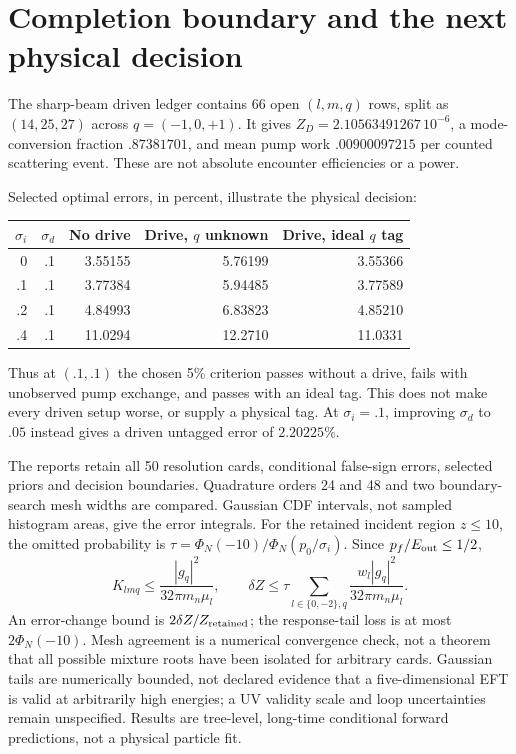 \documentclass[11pt,a4paper]{article}
\begin{document}
\section{Completion boundary and the next physical decision}
The sharp-beam driven ledger contains 66 open $(l,m,q)$ rows, split
as $(14,25,27)$ across $q=(-1,0,+1)$. It gives
$Z_D=2.10563491267\,10^{-6}$, a mode-conversion fraction $.87381701$,
and mean pump work $.00900097215$ per counted scattering event.
These are not absolute encounter efficiencies or a power.

Selected optimal errors, in percent, illustrate the physical decision:
\begin{center}
\begin{tabular}{rrrrr}
\toprule
$\sigma_i$ & $\sigma_d$ & No drive & Drive, $q$ unknown & Drive, ideal $q$ tag\\
\midrule
0 & .1 & 3.55155 & 5.76199 & 3.55366\\
.1 & .1 & 3.77384 & 5.94485 & 3.77589\\
.2 & .1 & 4.84993 & 6.83823 & 4.85210\\
.4 & .1 & 11.0294 & 12.2710 & 11.0331\\
\bottomrule
\end{tabular}
\end{center}
Thus at $(.1,.1)$ the chosen 5\% criterion passes without a drive,
fails with unobserved pump exchange, and passes with an ideal tag.
This does not make every driven setup worse, or supply a physical tag.
At $\sigma_i=.1$, improving $\sigma_d$ to $.05$ instead gives a
driven untagged error of $2.20225\%$.

The reports retain all 50 resolution cards, conditional false-sign
errors, selected priors and decision boundaries. Quadrature orders
24 and 48 and two boundary-search mesh widths are compared. Gaussian
CDF intervals, not sampled histogram areas, give the error integrals.
For the retained incident region $z\leq10$, the omitted probability is
$\tau=\Phi_{\!N}(-10)/\Phi_{\!N}(p_0/\sigma_i)$. Since
$p_f/E_{\rm out}\leq1/2$,
\begin{equation}
 K_{lmq}\leq\frac{|g_q|^2}{32\pi m_n\mu_l},\qquad
 \delta Z\leq\tau\sum_{l\in\{0,-2\},q}
 \frac{w_l|g_q|^2}{32\pi m_n\mu_l}.
\end{equation}
An error-change bound is $2\delta Z/Z_{\rm retained}$; the
response-tail loss is at most $2\Phi_{\!N}(-10)$.
Mesh agreement is a numerical convergence check, not a theorem that
all possible mixture roots have been isolated for arbitrary cards.
Gaussian tails are
numerically bounded, not declared evidence that a five-dimensional
EFT is valid at arbitrarily high energies; a UV validity scale and
loop uncertainties remain unspecified. Results are tree-level,
long-time conditional forward predictions, not a physical particle fit.
\end{document}
